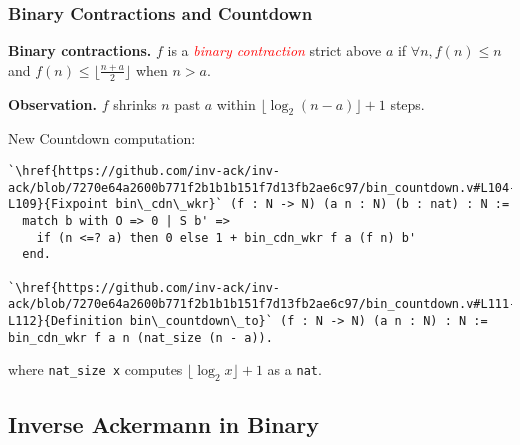 %
%
%
%
%
%



\begin{frame}[fragile]
\frametitle{Binary Contractions and Countdown}

\textbf{Binary contractions.} $f$ is a \textcolor{red}{\emph{binary contraction}} strict above $a$ if $\forall n, f(n)\le n$ and $f(n)\le \lfloor \frac{n+ a}{2} \rfloor$ when $n > a$.

\smallskip

\textbf{Observation.} $f$ shrinks $n$ past $a$ within $\lfloor\log_2(n - a) \rfloor + 1$ steps.

\bigskip

\pause 
New Countdown computation:
\begin{lstlisting}
`\href{https://github.com/inv-ack/inv-ack/blob/7270e64a2600b771f2b1b1b151f7d13fb2ae6c97/bin_countdown.v#L104-L109}{Fixpoint bin\_cdn\_wkr}` (f : N -> N) (a n : N) (b : nat) : N :=
  match b with O => 0 | S b' =>
    if (n <=? a) then 0 else 1 + bin_cdn_wkr f a (f n) b'
  end.

`\href{https://github.com/inv-ack/inv-ack/blob/7270e64a2600b771f2b1b1b151f7d13fb2ae6c97/bin_countdown.v#L111-L112}{Definition bin\_countdown\_to}` (f : N -> N) (a n : N) : N :=
bin_cdn_wkr f a n (nat_size (n - a)).
\end{lstlisting}

where \texttt{nat\_size x} computes $\lfloor \log_2x \rfloor + 1$ as a \texttt{nat}.
 
\end{frame}


\subsection{Inverse Ackermann in Binary}

